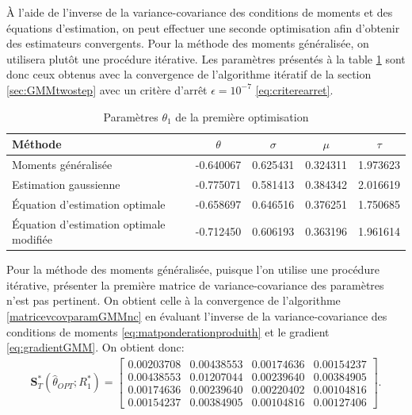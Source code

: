 À l'aide de l'inverse de la variance-covariance des conditions de
moments et des équations d'estimation, on peut effectuer une seconde
optimisation afin d'obtenir des estimateurs convergents. Pour la
méthode des moments généralisée, on utilisera plutôt une procédure
itérative. Les paramètres présentés à la table
\ref{tab:secondeoptimR1} sont donc ceux obtenus avec la convergence de
l'algorithme itératif de la section \ref{sec:GMMtwostep} avec un
critère d'arrêt $\epsilon=10^{-7}$ \eqref{eq:criterearret}.

\begin{table}[!ht]
  \centering
  \begin{tabular}{lcccc}
    \hline
    \textbf{Méthode} & $\theta$ & $\sigma$ & $\mu$ & $\tau$ \\
    \hline
    Moments généralisée & -0.640067 & 0.625431 & 0.324311 & 1.973623 \\
    Estimation gaussienne & -0.775071 & 0.581413 & 0.384342 & 2.016619 \\
    Équation d'estimation optimale & -0.658697 & 0.646516 & 0.376251 & 1.750685  \\
    Équation d'estimation optimale modifiée & -0.712450 & 0.606193 & 0.363196 & 1.961614  \\
    \hline
  \end{tabular}
  \caption{Paramètres $\theta_1$ de la première optimisation}
  \label{tab:secondeoptimR1}
\end{table}

Pour la méthode des moments généralisée, puisque l'on utilise une
procédure itérative, présenter la première matrice de
variance-covariance des paramètres n'est pas pertinent. On obtient
celle à la convergence de l'algorithme \eqref{matricevcovparamGMMnc}
en évaluant l'inverse de la variance-covariance des conditions de
moments \eqref{eq:matponderationproduith} et le gradient
\eqref{eq:gradientGMM}. On obtient donc:
\begin{align}
  \label{eq:vcov1gmmR1}
  \mathbf{S}_T^{*}(\hat\theta_{OPT};R_1^{*}) =
  \begin{bmatrix}
    0.00203708& 0.00438553& 0.00174636& 0.00154237\\
    0.00438553& 0.01207044& 0.00239640& 0.00384905\\
    0.00174636& 0.00239640& 0.00220402& 0.00104816\\
    0.00154237& 0.00384905& 0.00104816& 0.00127406
  \end{bmatrix}.
\end{align}

